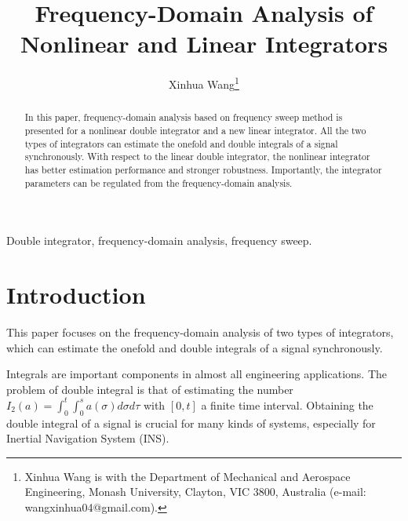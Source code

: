 \documentclass[10pt,journal]{IEEEtran}
\begin{document}
\title{Frequency-Domain Analysis of Nonlinear and Linear Integrators}
\author{Xinhua Wang\thanks{Xinhua Wang is with the Department of Mechanical and Aerospace Engineering,
Monash University, Clayton, VIC 3800, Australia (e-mail:
wangxinhua04@gmail.com).}}
\maketitle

\begin{abstract}
In this paper, frequency-domain analysis based on frequency sweep method is
presented for a nonlinear double integrator and a new linear integrator. All
the two types of integrators can estimate the onefold and double integrals
of a signal synchronously. With respect to the linear double integrator, the
nonlinear integrator has better estimation performance and stronger
robustness. Importantly, the integrator parameters can be regulated from the
frequency-domain analysis.
\end{abstract}

\begin{keywords}
Double integrator, frequency-domain analysis, frequency sweep.
\end{keywords}

\section{Introduction}

\setcounter{page}{1}This paper focuses on the frequency-domain analysis of
two types of integrators, which can estimate the onefold and double
integrals of a signal synchronously.

Integrals are important components in almost all engineering applications.
The problem of double integral is that of estimating the number $I_{2}\left(
a\right) =\int_{0}^{t}\int_{0}^{s}a\left( \sigma \right) d\sigma d\tau $
with $\left[ 0,t\right] $ a finite time interval. Obtaining the double
integral of a signal is crucial for many kinds of systems, especially for
Inertial Navigation System (INS).
\end{document}
